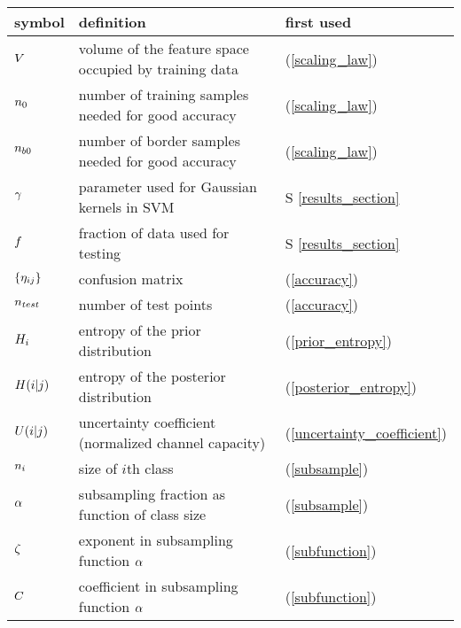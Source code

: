 \begin{tabular}{lll}
symbol & definition & first used \\ \hline
	$V$ & volume of the feature space occupied by training data & (\ref{scaling_law}) \\
	$n_0$ & number of training samples needed for good accuracy & (\ref{scaling_law}) \\
	$n_{b0}$ & number of border samples needed for good accuracy & (\ref{scaling_law}) \\
	$\gamma$ & parameter used for Gaussian kernels in SVM & S \ref{results_section} \\
	$f$ & fraction of data used for testing & S \ref{results_section} \\
	$\lbrace \eta_{ij} \rbrace$ & confusion matrix & (\ref{accuracy}) \\
	$n_{test}$ & number of test points & (\ref{accuracy}) \\
	$H_i$ & entropy of the prior distribution & (\ref{prior_entropy}) \\
	$H(i|j)$ & entropy of the posterior distribution & (\ref{posterior_entropy}) \\
	$U(i|j)$ & uncertainty coefficient (normalized channel capacity) & (\ref{uncertainty_coefficient}) \\
	$n_i$ & size of $i$th class & (\ref{subsample}) \\
	$\alpha$ & subsampling fraction as function of class size & (\ref{subsample}) \\
	$\zeta$ & exponent in subsampling function $\alpha$ & (\ref{subfunction}) \\
	$C$ & coefficient in subsampling function $\alpha$ & (\ref{subfunction}) \\
\end{tabular}


